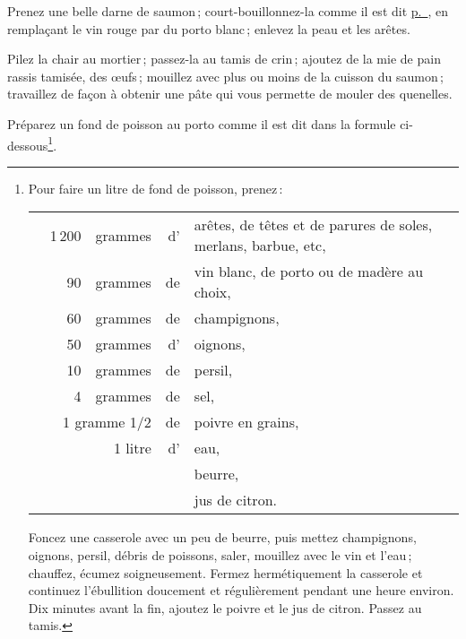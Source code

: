 Prenez une belle darne de saumon ; court-bouillonnez-la comme il est dit
\hyperlink{p0323}{p. \pageref{pg0323}}, en remplaçant le vin rouge par du porto
blanc ; enlevez la peau et les arêtes.

Pilez la chair au mortier ; passez-la au tamis de crin ; ajoutez de la mie de
pain rassis tamisée, des œufs ; mouillez avec plus ou moins de la cuisson du
saumon ; travaillez de façon à obtenir une pâte qui vous permette de mouler des
quenelles.

\bigskip

Préparez un fond de poisson au porto comme il est dit dans la formule
ci-dessous\footnote{
Pour faire un litre de fond de poisson, prenez :

\begin{longtable}{rrrrp{16em}}
  & 1 200 & grammes & d' & arêtes, de têtes et de parures de soles, merlans, barbue, etc,                 \\
  &    90 & grammes & de & vin blanc, de porto ou de madère au choix,                                     \\
  &    60 & grammes & de & champignons,                                                                   \\
  &    50 & grammes & d' & oignons,                                                                       \\
  &    10 & grammes & de & persil,                                                                        \\
  &     4 & grammes & de & sel,                                                                           \\
  & \multicolumn{2}{r}{1 gramme 1/2}  & de & poivre en grains,                                            \\
  &       & 1 litre & d’ & eau,                                                                           \\
  &       &         &    & beurre,                                                                        \\
  &       &         &    & jus de citron.                                                                 \\
\end{longtable}

Foncez une casserole avec un peu de beurre, puis mettez champignons, oignons,
persil, débris de poissons, saler, mouillez avec le vin et l’eau ; chauffez,
écumez soigneusement. Fermez hermétiquement la casserole et continuez
l'ébullition doucement et régulièrement pendant une heure environ. Dix minutes
avant la fin, ajoutez le poivre et le jus de citron. Passez au tamis.}.

